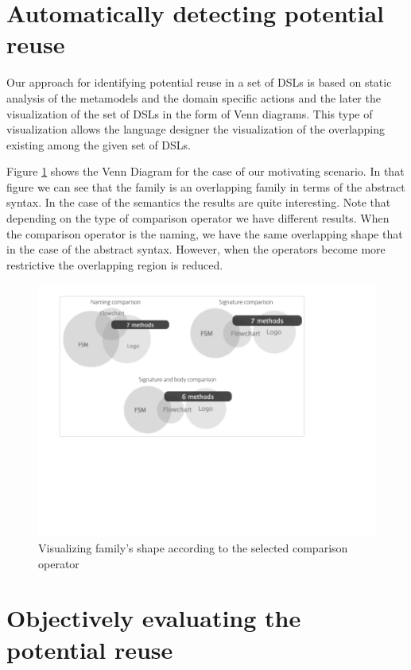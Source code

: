 \section{Automatically detecting potential reuse}
\label{sec:metrics}

Our approach for identifying potential reuse in a set of DSLs is based on static analysis of the metamodels and the domain specific actions and the later the visualization of the set of DSLs in the form of Venn diagrams. This type of visualization allows the language designer the visualization of the overlapping existing among the given set of DSLs.

Figure \ref{fig:shape} shows the Venn Diagram for the case of our motivating scenario. In that figure we can see that the family is an overlapping family in terms of the abstract syntax. In the case of the semantics the results are quite interesting. Note that depending on the type of comparison operator we have different results. When the comparison operator is the naming, we have the same overlapping shape that in the case of the abstract syntax. However, when the operators become more restrictive the overlapping region is reduced. 

\begin{figure}
\centering
\includegraphics[width=1\linewidth]{images/shape-fig.pdf}
\caption{Visualizing family's shape according to the selected comparison operator}
\label{fig:shape}
\end{figure}

\section{Objectively evaluating the potential reuse}


